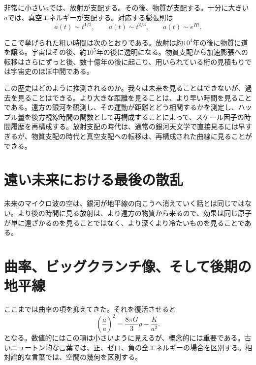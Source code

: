 非常に小さい\(a\)では、放射が支配する。その後、物質が支配する。十分に大きい\(a\)では、真空エネルギーが支配する。対応する膨張則は
\begin{equation}
a(t)\sim t^{1/2},
\qquad
a(t)\sim t^{2/3},
\qquad
a(t)\sim e^{Ht}.
\end{equation}

ここで挙げられた粗い時間は次のとおりである。放射は約\(10^4\)年の後に物質に道を譲る。宇宙はその後、約\(10^5\)年の後に透明になる。物質支配から加速膨張への転移はさらにずっと後、数十億年の後に起こり、用いられている桁の見積もりでは宇宙史のほぼ中間である。

この歴史はどのように推測されるのか。我々は未来を見ることはできないが、過去を見ることはできる。より大きな距離を見ることは、より早い時間を見ることである。遠方の銀河を観測し、その運動が距離とどう相関するかを測定し、ハッブル量を後方視線時間の関数として再構成することによって、スケール因子の時間履歴を再構成する。放射支配の時代は、通常の銀河天文学で直接見るには早すぎるが、物質支配の時代と真空支配への転移は、再構成された曲線に見ることができる。

\section{遠い未来における最後の散乱}

未来のマイクロ波の空は、銀河が地平線の向こうへ消えていく話とは同じではない。より後の時間に見る放射は、より遠方の物質から来るので、効果は同じ原子が単に遠ざかるのを見ることではなく、より深くより冷たいものを見ることである。

\begin{classroomqa}
\end{classroomqa}

\section{曲率、ビッグクランチ像、そして後期の地平線}

ここまでは曲率の項を抑えてきた。それを復活させると
\begin{equation}
\left(\frac{\dot a}{a}\right)^2
=
\frac{8\pi G}{3}\rho
-
\frac{K}{a^2}.
\end{equation}
となる。数値的にはこの項は小さいように見えるが、概念的には重要である。古いニュートン的な言葉では、正、ゼロ、負の全エネルギーの場合を区別する。相対論的な言葉では、空間の幾何を区別する。

